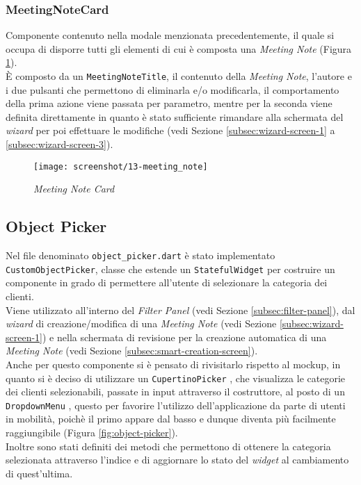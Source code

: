 \subsubsection*{MeetingNoteCard}
\label{subsubsec:meeting-note-card}

Componente contenuto nella modale menzionata precedentemente, il quale si occupa di disporre tutti gli elementi di cui è composta una \emph{Meeting Note} (Figura \ref{fig:meeting-note-card}).\\
È composto da un \lstinline{MeetingNoteTitle}, il contenuto della \emph{Meeting Note}, l'autore e i due pulsanti che permettono di eliminarla e/o modificarla, il comportamento della prima azione viene passata per parametro, mentre per la seconda viene definita direttamente in quanto è stato sufficiente rimandare alla schermata del \emph{wizard} per poi effettuare le modifiche (vedi Sezione \ref{subsec:wizard-screen-1} a \ref{subsec:wizard-screen-3}).

\begin{figure}[!h] 
    \centering 
    \texttt{[image: screenshot/13-meeting\_note]} 
    \caption{\emph{Meeting Note Card}}
    \label{fig:meeting-note-card}
\end{figure}

\subsection{Object Picker}
\label{subsec:object-picker}

Nel file denominato \lstinline{object_picker.dart} è stato implementato \lstinline{CustomObjectPicker}, classe che estende un \lstinline{StatefulWidget} per costruire un componente in grado di permettere all'utente di selezionare la categoria dei clienti. \\
Viene utilizzato all'interno del \emph{Filter Panel} (vedi Sezione \ref{subsec:filter-panel}), dal \emph{wizard} di creazione/modifica di una \emph{Meeting Note} (vedi Sezione \ref{subsec:wizard-screen-1}) e nella schermata di revisione per la creazione automatica di una \emph{Meeting Note} (vedi Sezione \ref{subsec:smart-creation-screen}).\\
Anche per questo componente si è pensato di rivisitarlo rispetto al \gls{mockup}\glsoccur, in quanto si è deciso di utilizzare un \lstinline{CupertinoPicker} \cite{site:cupertino-picker}, che visualizza le categorie dei clienti selezionabili, passate in input attraverso il costruttore, al posto di un \lstinline{DropdownMenu} \cite{site:dropdown-menu}, questo per favorire l'utilizzo dell'applicazione da parte di utenti in mobilità, poichè il primo appare dal basso e dunque diventa più facilmente raggiungibile (Figura \ref{fig:object-picker}). \\
Inoltre sono stati definiti dei metodi che permettono di ottenere la categoria selezionata attraverso l'indice e di aggiornare lo stato del \emph{widget} al cambiamento di quest'ultima.

